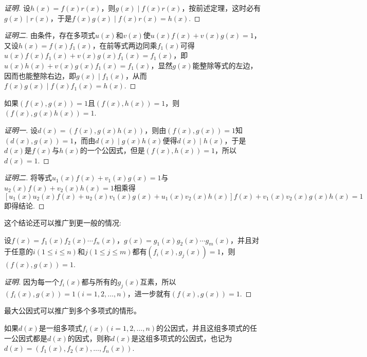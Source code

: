 \begin{proof}[证明]
  设$h(x)=f(x)r(x)$，则$g(x) \mid f(x)r(x)$，按前述定理，这时必有$g(x) \mid r(x)$，于是$f(x)g(x) \mid f(x)r(x) = h(x)$.
\end{proof}

\begin{proof}[证明二]
  由条件，存在多项式$u(x)$和$v(x)$使$u(x)f(x)+v(x)g(x)=1$，又设$h(x)=f(x)f_1(x)$，在前等式两边同乘$f_1(x)$可得$u(x)f(x)f_1(x)+v(x)g(x)f_1(x)=f_1(x)$，即$u(x)h(x)+v(x)g(x)f_1(x)=f_1(x)$，显然$g(x)$能整除等式的左边，因而也能整除右边，即$g(x) \mid f_1(x)$，从而$f(x)g(x) \mid f(x)f_1(x) = h(x)$.
\end{proof}

\begin{inference}
  如果$(f(x),g(x))=1$且$(f(x),h(x))=1$，则$(f(x),g(x)h(x))=1$.
\end{inference}

\begin{proof}[证明一]
  设$d(x)=(f(x),g(x)h(x))$，则由$(f(x),g(x))=1$知$(d(x),g(x))=1$，而由$d(x) \mid g(x)h(x)$便得$d(x) \mid h(x)$，于是$d(x)$是$f(x)$与$h(x)$的一个公因式，但是$(f(x),h(x))=1$，所以$d(x)=1$.
\end{proof}

\begin{proof}[证明二]
  将等式$u_1(x)f(x)+v_1(x)g(x)=1$与$u_2(x)f(x)+v_2(x)h(x)=1$相乘得
  \[ [u_1(x)u_2(x)f(x)+u_2(x)v_1(x)g(x)+u_1(x)v_2(x)h(x)]f(x)+v_1(x)v_2(x)g(x)h(x)=1 \]
 即得结论.
\end{proof}

这个结论还可以推广到更一般的情况:
\begin{theorem}
  \label{two-group-polynome-product-prime}
  设$f(x)=f_1(x)f_2(x) \cdots f_n(x)$，$g(x)=g_1(x)g_2(x) \cdots g_m(x)$，并且对于任意的$i(1 \leqslant i \leqslant n)$和$j(1 \leqslant j \leqslant m)$都有$(f_i(x), g_j(x))=1$，则$(f(x), g(x))=1$.
\end{theorem}

\begin{proof}[证明]
  因为每一个$f_i(x)$都与所有的$g_j(x)$互素，所以$(f_i(x), g(x))=1(i=1,2,\ldots,n)$，进一步就有$(f(x),g(x))=1$.
\end{proof}

最大公因式可以推广到多个多项式的情形。

\begin{definition}
  如果$d(x)$是一组多项式$f_i(x)(i=1,2,\ldots,n)$的公因式，并且这组多项式的任一公因式都是$d(x)$的因式，则称$d(x)$是这组多项式的公因式，也记为$d(x)=(f_1(x),f_2(x),\ldots,f_n(x))$.
\end{definition}

